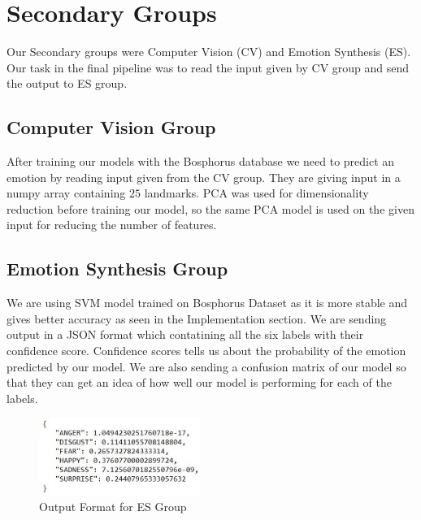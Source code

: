 \section{Secondary Groups}

Our Secondary groups were Computer Vision (CV) and Emotion Synthesis (ES). Our task in the final pipeline was to read the input given by CV group and send the output to ES group.

\subsection{Computer Vision Group}
After training our models with the Bosphorus database we need to predict an emotion by reading input given from the CV group. They are giving input in a numpy array containing $25$ landmarks. PCA was used for dimensionality reduction before training our model, so the same PCA model is used on the given input for reducing the number of features. 

\subsection{Emotion Synthesis Group}
We are using SVM model trained on Bosphorus Dataset as it is more stable and gives better accuracy as seen in the Implementation section. We are sending output in a JSON format which contatining all the six labels with their confidence score. Confidence scores tells us about the probability of the emotion predicted by our model. We are also sending a confusion matrix of our model so that they can get an idea of how well our model is performing for each of the labels.


\begin{figure}[H]
    \centering
    \includegraphics[height= 25mm]{figures/emotion_output.jpg}
    \caption{Output Format for ES Group}
    \label{emotion_output}
\end{figure}



